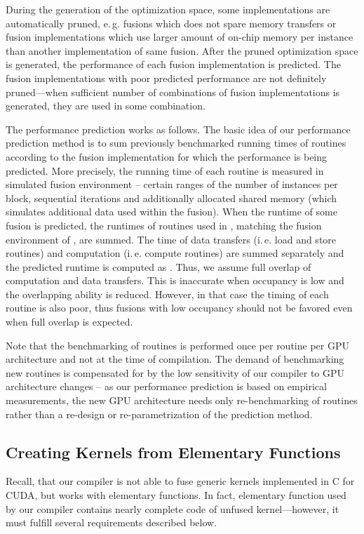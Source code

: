 \documentclass[final]{siamltex}
\def\eg{e.\,g.}
\def\ie{i.\,e.}
\begin{document}
{During the generation of the optimization space, some implementations are automatically pruned, \eg{} fusions which does not spare memory transfers or  fusion implementations which use larger amount of on-chip memory per instance than another implementation of same fusion. After the pruned optimization space is generated, the performance of each fusion implementation is predicted. The fusion implementations with poor predicted performance are not definitely pruned---when sufficient number of combinations of fusion implementations is generated, they are used in some combination.


The performance prediction works as follows. The basic idea of our performance prediction method is to sum previously benchmarked running times of routines according to the fusion implementation for which the performance is being predicted.
More precisely, the running time of each routine is measured in simulated fusion environment -- certain ranges of the number of instances per block, sequential iterations and additionally allocated shared memory (which simulates additional data used within the fusion). When the runtime of some fusion  is predicted, the runtimes of routines used in , matching the fusion environment of , are summed. The time of data transfers (\ie{} load and store routines)  and computation (\ie{} compute routines)  are summed separately and the predicted runtime is computed as . Thus, we assume full overlap of computation and data transfers. This is inaccurate when occupancy is low and the overlapping ability is reduced. However, in that case the timing of each routine is also poor, thus fusions with low occupancy should not be favored even when full overlap is expected.

Note that the benchmarking of routines is performed once per routine per GPU architecture and not at the time of compilation. The demand of benchmarking new routines is compensated for by the low sensitivity of our compiler to GPU architecture changes -- as our performance prediction is based on empirical measurements, the new GPU architecture needs only re-benchmarking of routines rather than a re-design or re-parametrization of the prediction method.

\subsection{Creating Kernels from Elementary Functions}

Recall, that our compiler is not able to fuse generic kernels implemented in C for CUDA, but works with elementary functions. In fact, elementary function used by our compiler contains nearly complete code of unfused kernel---however, it must fulfill several requirements described below.

}
\end{document}
